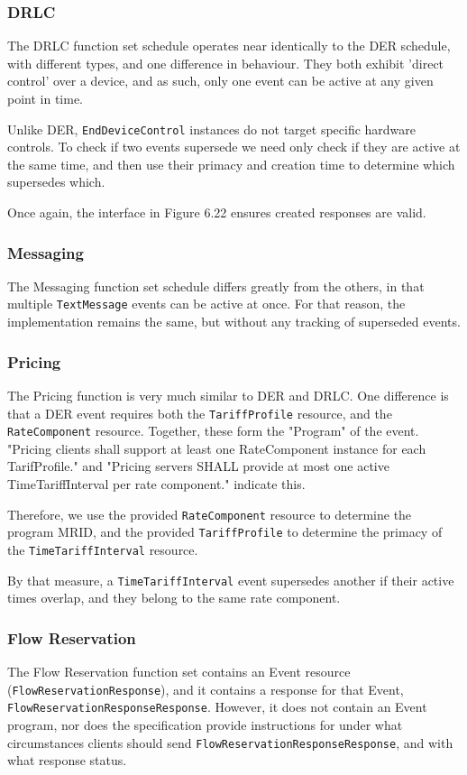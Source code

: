 \subsubsection{DRLC}
The DRLC function set schedule operates near identically to the DER schedule, with different types, and one difference in behaviour. They both exhibit 'direct control' over a device, and as such, only one event can be active at any given point in time.

Unlike DER, \texttt{EndDeviceControl} instances do not target specific hardware controls. To check if two events supersede we need only check if they are active at the same time, and then use their primacy and creation time to determine which supersedes which.

Once again, the interface in Figure 6.22 ensures created responses are valid.

\subsubsection{Messaging}
The Messaging function set schedule differs greatly from the others, in that multiple \texttt{TextMessage} events can be active at once. For that reason, the implementation remains the same, but without any tracking of superseded events.

\subsubsection{Pricing}
The Pricing function is very much similar to DER and DRLC. One difference is that a DER event requires both the \texttt{TariffProfile} resource, and the \texttt{RateComponent} resource. Together, these form the "Program" of the event. "Pricing clients shall support at least one RateComponent instance for each TarifProfile." and "Pricing servers SHALL provide at most one active TimeTariffInterval per rate component." indicate this.

Therefore, we use the provided \texttt{RateComponent} resource to determine the program MRID, and the provided \texttt{TariffProfile} to determine the primacy of the \texttt{TimeTariffInterval} resource. 

By that measure, a \texttt{TimeTariffInterval} event supersedes another if their active times overlap, and they belong to the same rate component.

\subsubsection{Flow Reservation}
The Flow Reservation function set contains an Event resource (\texttt{FlowReservationResponse}), and it contains a response for that Event, \texttt{FlowReservationResponseResponse}. However, it does not contain an Event program, nor does the specification provide instructions for under what circumstances clients should send \texttt{FlowReservationResponseResponse}, and with what response status.

